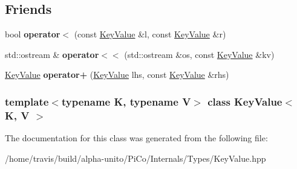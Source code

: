 \subsection*{\-Friends}
\begin{DoxyCompactItemize}
\item 
\hypertarget{class_key_value_a96e65cf641e10c9767a5f2c05787ec93}{bool {\bfseries operator$<$} (const \hyperlink{class_key_value}{\-Key\-Value} \&l, const \hyperlink{class_key_value}{\-Key\-Value} \&r)}\label{class_key_value_a96e65cf641e10c9767a5f2c05787ec93}

\item 
\hypertarget{class_key_value_a39c082a850561b5283e7bf5858a88cac}{std\-::ostream \& {\bfseries operator$<$$<$} (std\-::ostream \&os, const \hyperlink{class_key_value}{\-Key\-Value} \&kv)}\label{class_key_value_a39c082a850561b5283e7bf5858a88cac}

\item 
\hypertarget{class_key_value_a60405bd4e3c6371f045b28bb6100c58b}{\hyperlink{class_key_value}{\-Key\-Value} {\bfseries operator+} (\hyperlink{class_key_value}{\-Key\-Value} lhs, const \hyperlink{class_key_value}{\-Key\-Value} \&rhs)}\label{class_key_value_a60405bd4e3c6371f045b28bb6100c58b}

\end{DoxyCompactItemize}
\subsubsection*{template$<$typename K, typename V$>$ class Key\-Value$<$ K, V $>$}



\-The documentation for this class was generated from the following file\-:\begin{DoxyCompactItemize}
\item 
/home/travis/build/alpha-\/unito/\-Pi\-Co/\-Internals/\-Types/\-Key\-Value.\-hpp\end{DoxyCompactItemize}
